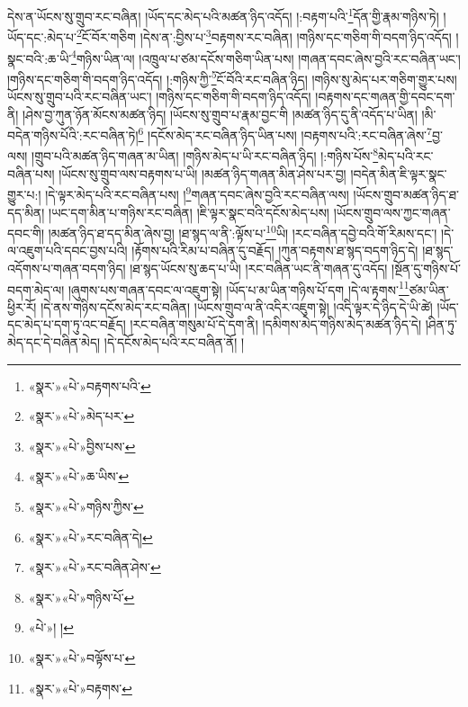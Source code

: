 དེས་ན་ཡོངས་སུ་གྲུབ་རང་བཞིན། །ཡོད་དང་མེད་པའི་མཚན་ཉིད་འདོད། །:བརྟག་པའི་\footnote{«སྣར་»«པེ་»བརྟགས་པའི་}དོན་གྱི་རྣམ་གཉིས་ཏེ། །ཡོད་དང་:མེད་པ་\footnote{«སྣར་»«པེ་»མེད་པར་}ངོ་བོར་གཅིག །དེས་ན་:བྱིས་པ་\footnote{«སྣར་»«པེ་»བྱིས་པས་}བརྟགས་རང་བཞིན། །གཉིས་དང་གཅིག་གི་བདག་ཉིད་འདོད། །སྣང་བའི་:ཆ་ཡི་\footnote{«སྣར་»«པེ་»ཆ་ཡིས་}གཉིས་ཡིན་ལ། །འཁྲུལ་པ་ཙམ་དངོས་གཅིག་ཡིན་པས། །གཞན་དབང་ཞེས་བྱའི་རང་བཞིན་ཡང་། །གཉིས་དང་གཅིག་གི་བདག་ཉིད་འདོད། །:གཉིས་ཀྱི་\footnote{«སྣར་»«པེ་»གཉིས་ཀྱིས་}ངོ་བོའི་རང་བཞིན་ཉིད། །གཉིས་སུ་མེད་པར་གཅིག་གྱུར་པས། ཡོངས་སུ་གྲུབ་པའི་རང་བཞིན་ཡང་། །གཉིས་དང་གཅིག་གི་བདག་ཉིད་འདོད། །བརྟགས་དང་གཞན་གྱི་དབང་དག་ནི། །ཤེས་བྱ་ཀུན་ཉོན་མོངས་མཚན་ཉིད། །ཡོངས་སུ་གྲུབ་པ་རྣམ་བྱང་གི །མཚན་ཉིད་དུ་ནི་འདོད་པ་ཡིན། །མི་བདེན་གཉིས་པོའི་:རང་བཞིན་ཏེ།\footnote{«སྣར་»«པེ་»རང་བཞིན་དེ།} །དངོས་མེད་རང་བཞིན་ཉིད་ཡིན་པས། །བརྟགས་པའི་:རང་བཞིན་ཞེས་\footnote{«སྣར་»«པེ་»རང་བཞིན་ཤེས་}བྱ་ལས། །གྲུབ་པའི་མཚན་ཉིད་གཞན་མ་ཡིན། །གཉིས་མེད་པ་ཡི་རང་བཞིན་ཉིད། །:གཉིས་པོས་\footnote{«སྣར་»«པེ་»གཉིས་པོ་}མེད་པའི་རང་བཞིན་པས། །ཡོངས་སུ་གྲུབ་ལས་བརྟགས་པ་ཡི། །མཚན་ཉིད་གཞན་མིན་ཤེས་པར་བྱ། །བདེན་མིན་ཇི་ལྟར་སྣང་གྱུར་པ:། །དེ་ལྟར་མེད་པའི་རང་བཞིན་པས། །\footnote{«པེ་»། །}གཞན་དབང་ཞེས་བྱའི་རང་བཞིན་ལས། །ཡོངས་གྲུབ་མཚན་ཉིད་ཐ་དད་མིན། །ཡང་དག་མིན་པ་གཉིས་རང་བཞིན། །ཇི་ལྟར་སྣང་བའི་དངོས་མེད་པས། །ཡོངས་གྲུབ་ལས་ཀྱང་གཞན་དབང་གི། །མཚན་ཉིད་ཐ་དད་མིན་ཞེས་བྱ། །ཐ་སྙད་ལ་ནི་:ལྟོས་པ་\footnote{«སྣར་»«པེ་»བལྟོས་པ་}ཡི། །རང་བཞིན་དབྱེ་བའི་གོ་རིམས་དང་། །དེ་ལ་འཇུག་པའི་དབང་བྱས་པའི། །རྟོགས་པའི་རིམ་པ་བཞིན་དུ་བརྗོད། །ཀུན་བརྟགས་ཐ་སྙད་བདག་ཉིད་དེ། །ཐ་སྙད་འདོགས་པ་གཞན་བདག་ཉིད། །ཐ་སྙད་ཡོངས་སུ་ཆད་པ་ཡི། །རང་བཞིན་ཡང་ནི་གཞན་དུ་འདོད། །སྔོན་དུ་གཉིས་པོ་བདག་མེད་ལ། །ཞུགས་པས་གཞན་དབང་ལ་འཇུག་སྟེ། །ཡོད་པ་མ་ཡིན་གཉིས་པོ་དག །དེ་ལ་རྟགས་\footnote{«སྣར་»«པེ་»བརྟགས་}ཙམ་ཡིན་ཕྱིར་རོ། །དེ་ནས་གཉིས་དངོས་མེད་རང་བཞིན། །ཡོངས་གྲུབ་ལ་ནི་འདིར་འཇུག་སྟེ། །འདི་ལྟར་དེ་ཉིད་དེ་ཡི་ཚེ། །ཡོད་དང་མེད་པ་དག་ཏུ་འང་བརྗོད། །རང་བཞིན་གསུམ་པོ་དེ་དག་ནི། །དམིགས་མེད་གཉིས་མེད་མཚན་ཉིད་དེ། །ཤིན་ཏུ་མེད་དང་དེ་བཞིན་མེད། །དེ་དངོས་མེད་པའི་རང་བཞིན་ནོ། །
